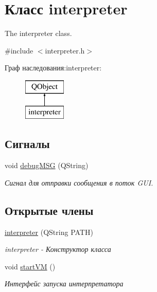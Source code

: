 \hypertarget{classinterpreter}{}\section{Класс interpreter}
\label{classinterpreter}


The interpreter class.  




{\ttfamily \#include $<$interpreter.\+h$>$}

Граф наследования\+:interpreter\+:\begin{figure}[H]
\begin{center}
\leavevmode
\includegraphics[height=2.000000cm]{classinterpreter}
\end{center}
\end{figure}
\subsection*{Сигналы}
\begin{DoxyCompactItemize}
\item 
\hypertarget{classinterpreter_a60e0781065c7ae88bdcaaa22729dc458}{}\label{classinterpreter_a60e0781065c7ae88bdcaaa22729dc458} 
void \hyperlink{classinterpreter_a60e0781065c7ae88bdcaaa22729dc458}{debug\+M\+SG} (Q\+String)
\begin{DoxyCompactList}\small\item\em Сигнал для отправки сообщения в поток G\+UI. \end{DoxyCompactList}\end{DoxyCompactItemize}
\subsection*{Открытые члены}
\begin{DoxyCompactItemize}
\item 
\hyperlink{classinterpreter_ae7359f1d2aa18579a2797f49835c8671}{interpreter} (Q\+String P\+A\+TH)
\begin{DoxyCompactList}\small\item\em interpreter -\/ Конструктор класса \end{DoxyCompactList}\item 
void \hyperlink{classinterpreter_af9ed8afd864c69cfd1ec1e849b2d1542}{start\+VM} ()
\begin{DoxyCompactList}\small\item\em Интерфейс запуска интерпретатора \end{DoxyCompactList}\end{DoxyCompactItemize}
